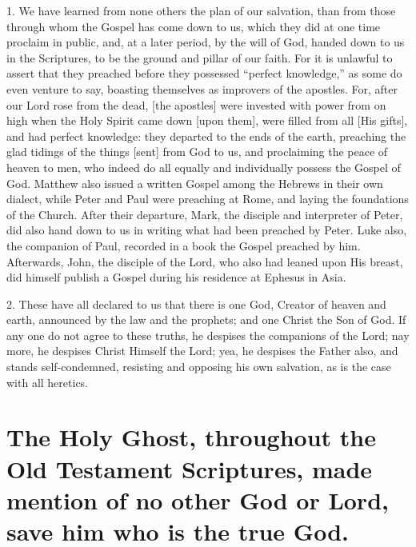 \documentclass[9pt, twocolumn, oneside, a4paper]{memoir}
\begin{document}
1. We have learned from none others the plan of our salvation, than from those through whom the Gospel has come down to us, which they did at one time proclaim in public, and, at a later period, by the will of God, handed down to us in the Scriptures, to be the ground and pillar of our faith.  For it is unlawful to assert that they preached before they possessed ``perfect knowledge,'' as some do even venture to say, boasting themselves as improvers of the apostles. For, after our Lord rose from the dead, [the apostles] were invested with power from on high when the Holy Spirit came down [upon them], were filled from all [His gifts], and had perfect knowledge: they departed to the ends of the earth, preaching the glad tidings of the  things [sent] from God to us, and proclaiming the peace of heaven to men, who indeed do all equally and individually possess the Gospel of God. Matthew also issued a written Gospel among the Hebrews  in their own dialect, while Peter and Paul were preaching at Rome, and laying the foundations of the Church. After their departure, Mark, the disciple and interpreter of Peter, did also hand down to us in writing what had been preached by Peter. Luke also, the companion of Paul, recorded in a book the Gospel preached by him. Afterwards, John, the disciple of the Lord, who also had leaned upon His breast, did himself publish a Gospel during his residence at Ephesus in Asia.

2. These have all declared to us that there is one God, Creator of heaven and earth, announced  by the law and the prophets; and one Christ the Son of God. If any one do not agree to these truths, he despises the companions of the Lord; nay more, he despises Christ Himself the Lord; yea, he despises the Father also, and stands self-condemned, resisting and opposing his own salvation, as is the case with all heretics.
\section*{The Holy Ghost, throughout the Old Testament Scriptures, made mention of no other God or Lord, save him who is the true God.}
\end{document}
